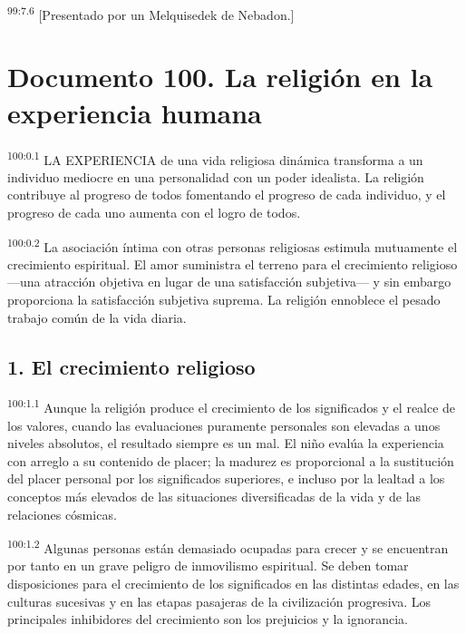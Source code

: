 \documentclass[twoside, 11pt]{book}
\begin{document}
\par
\textsuperscript{99:7.6} [Presentado por un Melquisedek de Nebadon.]


\chapter{Documento 100. La religión en la experiencia humana}
\par
\textsuperscript{100:0.1} LA EXPERIENCIA de una vida religiosa dinámica transforma a un individuo mediocre en una personalidad con un poder idealista. La religión contribuye al progreso de todos fomentando el progreso de cada individuo, y el progreso de cada uno aumenta con el logro de todos.

\par
\textsuperscript{100:0.2} La asociación íntima con otras personas religiosas estimula mutuamente el crecimiento espiritual. El amor suministra el terreno para el crecimiento religioso ---una atracción objetiva en lugar de una satisfacción subjetiva--- y sin embargo proporciona la satisfacción subjetiva suprema. La religión ennoblece el pesado trabajo común de la vida diaria.

\section*{1. El crecimiento religioso}
\par
\textsuperscript{100:1.1} Aunque la religión produce el crecimiento de los significados y el realce de los valores, cuando las evaluaciones puramente personales son elevadas a unos niveles absolutos, el resultado siempre es un mal. El niño evalúa la experiencia con arreglo a su contenido de placer; la madurez es proporcional a la sustitución del placer personal por los significados superiores, e incluso por la lealtad a los conceptos más elevados de las situaciones diversificadas de la vida y de las relaciones cósmicas.

\par
\textsuperscript{100:1.2} Algunas personas están demasiado ocupadas para crecer y se encuentran por tanto en un grave peligro de inmovilismo espiritual. Se deben tomar disposiciones para el crecimiento de los significados en las distintas edades, en las culturas sucesivas y en las etapas pasajeras de la civilización progresiva. Los principales inhibidores del crecimiento son los prejuicios y la ignorancia.
\end{document}
